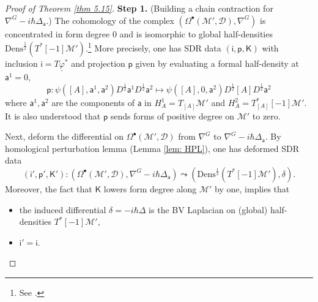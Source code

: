 \documentclass[11pt,a4paper]{amsart}
\theoremstyle{plain} %
\theoremstyle{definition}
\theoremstyle{remark}
\newcommand{\mr}{\mathrm}
\newcommand{\sfa}{\mathsf{a}}
\newcommand{\bt}{\bullet}
\newcommand{\M}{\mathcal{M}}
\newcommand{\mc}{\mathcal}
\newcommand{\ul}{\underline}
\begin{document}
\begin{proof}[Proof of Theorem \ref{thm 5.15}]
    \textbf{Step 1.} (Building a chain contraction for $\nabla^G-i\hbar\Delta_\sfa$.)
    The cohomology of the complex $(\Omega^\bt(\M', 
    \mc{D}
    ),\nabla^G)$ is concentrated in form degree $0$ and is isomorphic to global half-densities $\mr{Dens}^{\frac12}(T^*[-1]\M')$.\footnote{
    See \cite[Section 2]{Bonechi2012}.
    }
    More precisely, one has SDR data $(\mathsf{i},\mathsf{p},\mathsf{K})$ with inclusion $\mathsf{i}=T\ul\varphi^*$ and projection $\mathsf{p}$ given by evaluating a formal half-density at $\sfa^1=0$,
    \begin{equation}
        \mathsf{p}: \psi([A],\sfa^1,\sfa^2)D^{\frac12} \sfa^1 D^{\frac12}\sfa^2\mapsto \psi([A],0,\sfa^2) D^{\frac12} [A] D^{\frac12}\sfa^2
    \end{equation}
    where $\sfa^1,\sfa^2$ are the components of $\sfa$ in $H^1_A=T_{[A]}\M'$ and $H^2_A=T^*_{[A]}[-1] \M'$. It is also understood that $\mathsf{p}$ sends forms of positive degree on $\M'$ to zero.

    Next, deform the differential on $\Omega^\bt(\M', %
    \mc{D}
    )$ from $\nabla^G$ to $\nabla^G-i\hbar\Delta_\sfa$. By homological perturbation lemma (Lemma \ref{lem: HPL}), one has deformed SDR data
    \begin{equation}\label{(i',p',K')}
    (\mathsf{i}',\mathsf{p}',\mathsf{K}')\colon (\Omega^\bt(\M', %
    \mc{D}
    ), \nabla^G -i\hbar\Delta_\sfa) \leadsto (\mr{Dens}^{\frac12}(T^*[-1]\M'),\delta).
    \end{equation} 
    Moreover, the fact that $\mathsf{K}$ lowers form degree along $\M'$ by one, implies that 
    \begin{itemize}
    \item the induced differential $\delta=-i\hbar\Delta$ is the BV Laplacian on (global) half-densities $T^*[-1]\M'$,
    \item $\mathsf{i}'=\mathsf{i}$.
    \end{itemize}
    

\end{proof}
\end{document}
